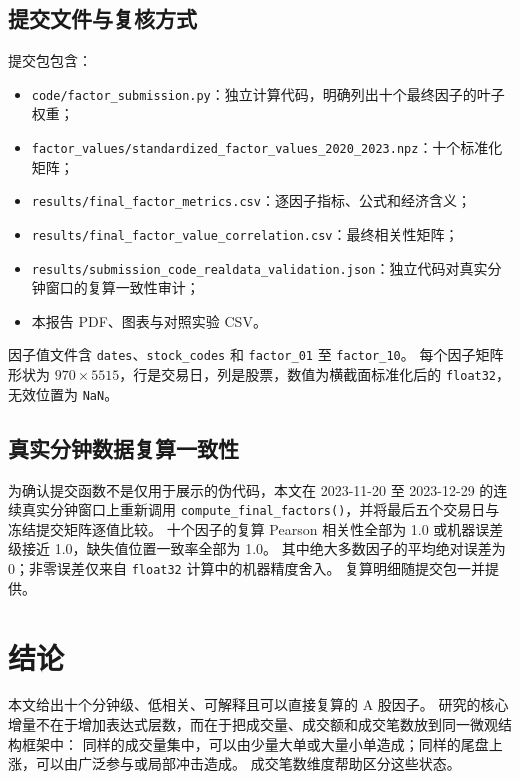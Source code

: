 \documentclass[UTF8,11pt,a4paper]{ctexart}
\begin{document}
\subsection{提交文件与复核方式}

提交包包含：
\begin{itemize}[leftmargin=2em]
  \item \texttt{code/factor\_submission.py}：独立计算代码，明确列出十个最终因子的叶子权重；
  \item \texttt{factor\_values/standardized\_factor\_values\_2020\_2023.npz}：十个标准化矩阵；
  \item \texttt{results/final\_factor\_metrics.csv}：逐因子指标、公式和经济含义；
  \item \texttt{results/final\_factor\_value\_correlation.csv}：最终相关性矩阵；
  \item \texttt{results/submission\_code\_realdata\_validation.json}：独立代码对真实分钟窗口的复算一致性审计；
  \item 本报告 PDF、图表与对照实验 CSV。
\end{itemize}

因子值文件含 \texttt{dates}、\texttt{stock\_codes} 和 \texttt{factor\_01} 至 \texttt{factor\_10}。
每个因子矩阵形状为 $970\times 5515$，行是交易日，列是股票，数值为横截面标准化后的 \texttt{float32}，无效位置为 \texttt{NaN}。

\subsection{真实分钟数据复算一致性}

为确认提交函数不是仅用于展示的伪代码，本文在 2023-11-20 至 2023-12-29 的连续真实分钟窗口上重新调用
\texttt{compute\_final\_factors()}，并将最后五个交易日与冻结提交矩阵逐值比较。
十个因子的复算 Pearson 相关性全部为 1.0 或机器误差级接近 1.0，缺失值位置一致率全部为 1.0。
其中绝大多数因子的平均绝对误差为 0；非零误差仅来自 \texttt{float32} 计算中的机器精度舍入。
复算明细随提交包一并提供。

\section{结论}

本文给出十个分钟级、低相关、可解释且可以直接复算的 A 股因子。
研究的核心增量不在于增加表达式层数，而在于把成交量、成交额和成交笔数放到同一微观结构框架中：
同样的成交量集中，可以由少量大单或大量小单造成；同样的尾盘上涨，可以由广泛参与或局部冲击造成。
成交笔数维度帮助区分这些状态。
\end{document}
